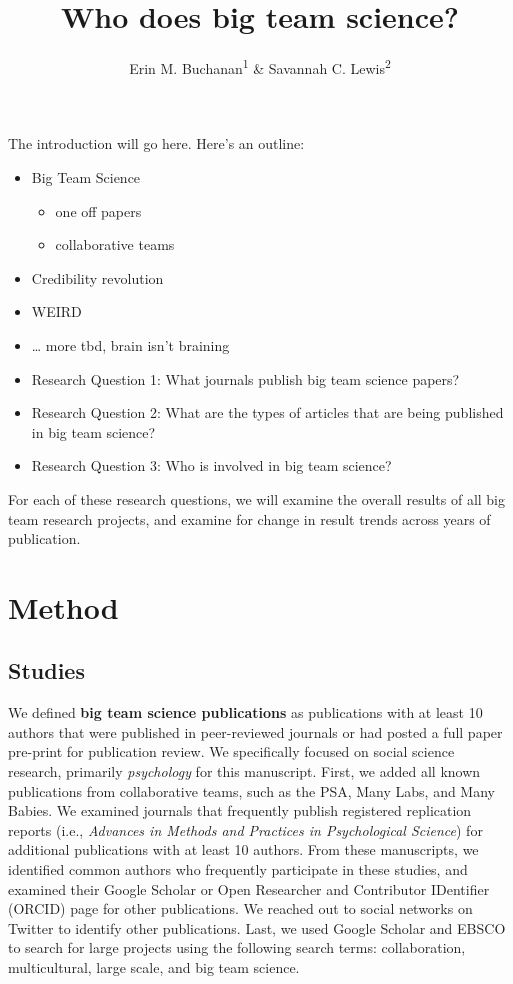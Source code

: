 \documentclass[
  man]{apa6}
\title{Who does big team science?}
\author{Erin M. Buchanan\textsuperscript{1} \& Savannah C. Lewis\textsuperscript{2}}
\date{}
\affiliation{\vspace{0.5cm}\textsuperscript{1} Harrisburg University of Science and Technology\\\textsuperscript{2} University of Alabama}
\providecommand{\tightlist}{%
  \setlength{\itemsep}{0pt}\setlength{\parskip}{0pt}}
\begin{document}
\maketitle

The introduction will go here. Here's an outline:

\begin{itemize}
\item
  Big Team Science

  \begin{itemize}
  \tightlist
  \item
    one off papers
  \item
    collaborative teams
  \end{itemize}
\item
  Credibility revolution
\item
  WEIRD
\item
  \ldots{} more tbd, brain isn't braining
\item
  Research Question 1: What journals publish big team science papers?
\item
  Research Question 2: What are the types of articles that are being published in big team science?
\item
  Research Question 3: Who is involved in big team science?
\end{itemize}

For each of these research questions, we will examine the overall results of all big team research projects, and examine for change in result trends across years of publication.

\hypertarget{method}{%
\section{Method}\label{method}}

\hypertarget{studies}{%
\subsection{Studies}\label{studies}}

We defined \textbf{big team science publications} as publications with at least 10 authors that were published in peer-reviewed journals or had posted a full paper pre-print for publication review. We specifically focused on social science research, primarily \emph{psychology} for this manuscript. First, we added all known publications from collaborative teams, such as the PSA, Many Labs, and Many Babies. We examined journals that frequently publish registered replication reports (i.e., \emph{Advances in Methods and Practices in Psychological Science}) for additional publications with at least 10 authors. From these manuscripts, we identified common authors who frequently participate in these studies, and examined their Google Scholar or Open Researcher and Contributor IDentifier (ORCID) page for other publications. We reached out to social networks on Twitter to identify other publications. Last, we used Google Scholar and EBSCO to search for large projects using the following search terms: collaboration, multicultural, large scale, and big team science.
\end{document}
